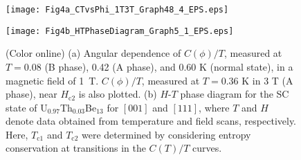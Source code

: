 \documentclass[twocolumn, prl]{revtex4}%
\begin{document}
\begin{centering}
\begin{figure}%
\begin{minipage}{4.1cm}
\texttt{[image: Fig4a\_CTvsPhi\_1T3T\_Graph48\_4\_EPS.eps]}
\end{minipage}
\begin{minipage}{4.1cm}
\texttt{[image: Fig4b\_HTPhaseDiagram\_Graph5\_1\_EPS.eps]}
\end{minipage} 
\caption{ (Color online) 
(a) Angular dependence of $C(\phi)/T$, measured at $T=$0.08 (B phase), 0.42 (A phase), and 0.60 K (normal state),   
in a magnetic field of  1~T.
  $C(\phi)/T$, measured at $T=$0.36 K in 3 T  (A phase), near $H_{\mathrm{c2} }$ is also plotted.   
(b)  
 $H$-$T$ phase diagram for the SC state of U$_{0.97}$Th$_{0.03}$Be$_{13}$ for $[001]$ and $[111]$, 
 where  $T$ and $H$ denote data obtained from temperature and field scans, respectively.
Here, $T_{\mathrm{c1} }$ and $T_{\mathrm{c2} }$ were determined by considering entropy conservation
 at  transitions  in the $C(T)/T$ curves.
 }
\end{figure}
\end{centering}




\color{black}
\end{document}

